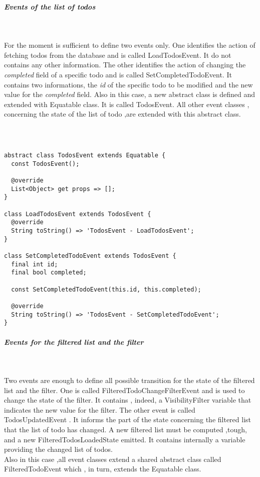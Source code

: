 \subparagraph{Events of the list of todos}\mbox{}\\
\label{subpar:todo_app_bloc_core_state}

For the moment is sufficient to define two events only. One identifies the action of fetching todos from the database and is called LoadTodosEvent. It do not contains any other information. The other identifies the action of changing the \textit{completed} field of a specific todo and is called SetCompletedTodoEvent. It contains two informations, the \textit{id} of the specific todo to be modified and the new value for the \textit{completed }field. 
Also in this case, a new abstract class is defined and extended with Equatable class. It is called TodosEvent. All other event classes , concerning the state of the list of todo ,are extended with this abstract class.
\begin{code}
\mbox{}\\
 \mbox{}
\label{code:2.14}
\begin{verbatim}

abstract class TodosEvent extends Equatable {
  const TodosEvent();

  @override
  List<Object> get props => [];
}

class LoadTodosEvent extends TodosEvent {
  @override
  String toString() => 'TodosEvent - LoadTodosEvent';
}

class SetCompletedTodoEvent extends TodosEvent {
  final int id;
  final bool completed;

  const SetCompletedTodoEvent(this.id, this.completed);

  @override
  String toString() => 'TodosEvent - SetCompletedTodoEvent';
}
\end{verbatim}
\mbox{}
\end{code}

\subparagraph{Events for the filtered list and the filter}\mbox{}\\
\label{subpar:todo_app_bloc_core_state}

Two events are enough to define all possible transition for the state of the filtered list and the filter. One is called FilteredTodoChangeFilterEvent and is used to change the state of the filter. It contains , indeed, a VisibilityFilter variable  that indicates the new value for the filter. The other event is called TodosUpdatedEvent . It informs the part of the state concerning the filtered list that the list of todo has changed. A new filtered list must be computed ,tough, and a new FilteredTodosLoadedState emitted. It contains internally a variable providing the changed list of todos.\\
Also in this case ,all event classes extend a shared abstract class called FilteredTodoEvent which , in turn, extends the Equatable class. 


